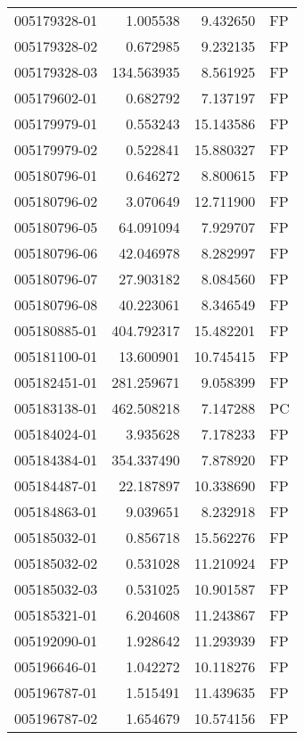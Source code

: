 \begin{tabular}{lrrl}
005179328-01 &    1.005538 &       9.432650 &   FP \\
005179328-02 &    0.672985 &       9.232135 &   FP \\
005179328-03 &  134.563935 &       8.561925 &   FP \\
005179602-01 &    0.682792 &       7.137197 &   FP \\
005179979-01 &    0.553243 &      15.143586 &   FP \\
005179979-02 &    0.522841 &      15.880327 &   FP \\
005180796-01 &    0.646272 &       8.800615 &   FP \\
005180796-02 &    3.070649 &      12.711900 &   FP \\
005180796-05 &   64.091094 &       7.929707 &   FP \\
005180796-06 &   42.046978 &       8.282997 &   FP \\
005180796-07 &   27.903182 &       8.084560 &   FP \\
005180796-08 &   40.223061 &       8.346549 &   FP \\
005180885-01 &  404.792317 &      15.482201 &   FP \\
005181100-01 &   13.600901 &      10.745415 &   FP \\
005182451-01 &  281.259671 &       9.058399 &   FP \\
005183138-01 &  462.508218 &       7.147288 &   PC \\
005184024-01 &    3.935628 &       7.178233 &   FP \\
005184384-01 &  354.337490 &       7.878920 &   FP \\
005184487-01 &   22.187897 &      10.338690 &   FP \\
005184863-01 &    9.039651 &       8.232918 &   FP \\
005185032-01 &    0.856718 &      15.562276 &   FP \\
005185032-02 &    0.531028 &      11.210924 &   FP \\
005185032-03 &    0.531025 &      10.901587 &   FP \\
005185321-01 &    6.204608 &      11.243867 &   FP \\
005192090-01 &    1.928642 &      11.293939 &   FP \\
005196646-01 &    1.042272 &      10.118276 &   FP \\
005196787-01 &    1.515491 &      11.439635 &   FP \\
005196787-02 &    1.654679 &      10.574156 &   FP \\

\end{tabular}
